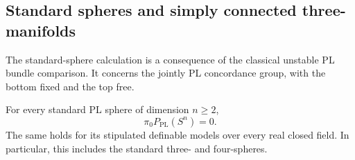 \subsection{Standard spheres and simply connected three-manifolds}

The standard-sphere calculation is a consequence of the classical
unstable PL bundle comparison.  It concerns the jointly PL concordance
group, with the bottom fixed and the top free.

\begin{theorem}\label{thm:standard-sphere-components}
For every standard PL sphere of dimension $n\geq2$,
\[
                    \pi_0P_{\mathrm{PL}}(S^n)=0.
\]
The same holds for its stipulated definable models over every real
closed field.  In particular, this includes the standard three- and
four-spheres.
\end{theorem}


